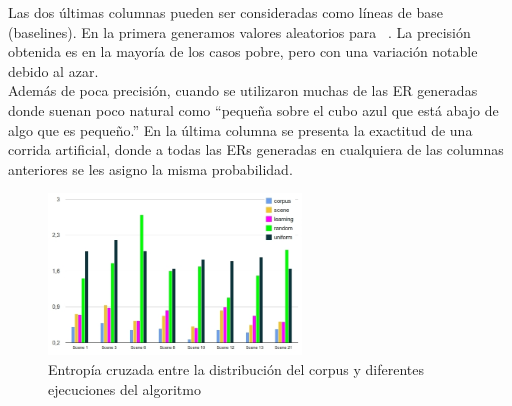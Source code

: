 
Las dos \'ultimas columnas pueden ser consideradas como l\'{i}neas de base (baselines). En la primera generamos
valores aleatorios para \puse\ . La precisi\'on obtenida es en la mayor\'{i}a de los casos pobre, pero con
una variaci\'on notable debido al azar.\\



Adem\'as de poca precisi\'on, cuando se utilizaron muchas de las ER generadas donde suenan poco natural como ``peque\~na sobre
el cubo azul que est\'a abajo de algo que es peque\~no.'' En la \'ultima columna se presenta la exactitud de una corrida artificial, donde a todas las ERs generadas en cualquiera de las columnas anteriores se les asigno la misma probabilidad.\\


\begin{figure}[ht]
\centering
\includegraphics[width=0.6\textwidth]{images/entropy.jpg}
\caption{Entrop\'ia cruzada entre la distribuci\'on del corpus y diferentes ejecuciones del algoritmo}\label{Entropy}
\end{figure}
  

%
%

